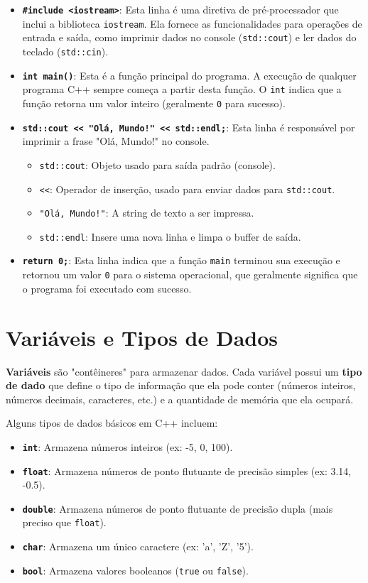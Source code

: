 \documentclass{article}
\begin{document}
\begin{itemize}
    \item \textbf{\texttt{\#include <iostream>}}: Esta linha é uma diretiva de pré-processador que inclui a biblioteca \texttt{iostream}. Ela fornece as funcionalidades para operações de entrada e saída, como imprimir dados no console (\texttt{std::cout}) e ler dados do teclado (\texttt{std::cin}).
    \item \textbf{\texttt{int main()}}: Esta é a função principal do programa. A execução de qualquer programa C++ sempre começa a partir desta função. O \texttt{int} indica que a função retorna um valor inteiro (geralmente \texttt{0} para sucesso).
    \item \textbf{\texttt{std::cout << "Olá, Mundo!" << std::endl;}}: Esta linha é responsável por imprimir a frase "Olá, Mundo!" no console.
    \begin{itemize}
        \item \texttt{std::cout}: Objeto usado para saída padrão (console).
        \item \texttt{<<}: Operador de inserção, usado para enviar dados para \texttt{std::cout}.
        \item \texttt{"Olá, Mundo!"}: A string de texto a ser impressa.
        \item \texttt{std::endl}: Insere uma nova linha e limpa o buffer de saída.
    \end{itemize}
    \item \textbf{\texttt{return 0;}}: Esta linha indica que a função \texttt{main} terminou sua execução e retornou um valor \texttt{0} para o sistema operacional, que geralmente significa que o programa foi executado com sucesso.
\end{itemize}

\section{Variáveis e Tipos de Dados}
\textbf{Variáveis} são "contêineres" para armazenar dados. Cada variável possui um \textbf{tipo de dado} que define o tipo de informação que ela pode conter (números inteiros, números decimais, caracteres, etc.) e a quantidade de memória que ela ocupará.

Alguns tipos de dados básicos em C++ incluem:
\begin{itemize}
    \item \textbf{\texttt{int}}: Armazena números inteiros (ex: -5, 0, 100).
    \item \textbf{\texttt{float}}: Armazena números de ponto flutuante de precisão simples (ex: 3.14, -0.5).
    \item \textbf{\texttt{double}}: Armazena números de ponto flutuante de precisão dupla (mais preciso que \texttt{float}).
    \item \textbf{\texttt{char}}: Armazena um único caractere (ex: 'a', 'Z', '5').
    \item \textbf{\texttt{bool}}: Armazena valores booleanos (\texttt{true} ou \texttt{false}).
\end{itemize}
\end{document}
